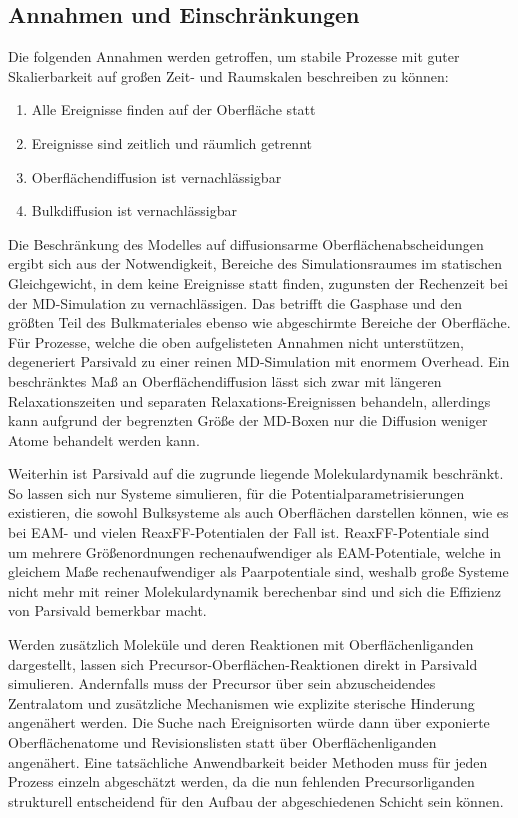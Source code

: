 \subsection{Annahmen und Einschränkungen}

Die folgenden Annahmen werden getroffen, um stabile Prozesse mit guter Skalierbarkeit auf großen Zeit- und Raumskalen beschreiben zu können:

\begin{enumerate}
\setlength\itemsep{0ex}
\item Alle Ereignisse finden auf der Oberfläche statt
\item Ereignisse sind zeitlich und räumlich getrennt
\item Oberflächendiffusion ist vernachlässigbar
\item Bulkdiffusion ist vernachlässigbar
\end{enumerate}

Die Beschränkung des Modelles auf diffusionsarme Oberflächenabscheidungen ergibt sich aus der Notwendigkeit, Bereiche des Simulationsraumes im statischen Gleichgewicht, in dem keine Ereignisse statt finden, zugunsten der Rechenzeit bei der MD-Simulation zu vernachlässigen.
Das betrifft die Gasphase und den größten Teil des Bulkmateriales ebenso wie abgeschirmte Bereiche der Oberfläche.
Für Prozesse, welche die oben aufgelisteten Annahmen nicht unterstützen, degeneriert Parsivald zu einer reinen MD-Simulation mit enormem Overhead.
Ein beschränktes Maß an Oberflächendiffusion lässt sich zwar mit längeren Relaxationszeiten und separaten Relaxations-Ereignissen behandeln, allerdings kann aufgrund der begrenzten Größe der MD-Boxen nur die Diffusion weniger Atome behandelt werden kann.

Weiterhin ist Parsivald auf die zugrunde liegende Molekulardynamik beschränkt.
So lassen sich nur Systeme simulieren, für die Potentialparametrisierungen existieren, die sowohl Bulksysteme als auch Oberflächen darstellen können, wie es bei EAM- und vielen ReaxFF-Potentialen der Fall ist.
ReaxFF-Potentiale sind um mehrere Größenordnungen rechenaufwendiger als EAM-Potentiale, welche in gleichem Maße rechenaufwendiger als Paarpotentiale sind, weshalb große Systeme nicht mehr mit reiner Molekulardynamik berechenbar sind und sich die Effizienz von Parsivald bemerkbar macht.

Werden zusätzlich Moleküle und deren Reaktionen mit Oberflächenliganden dargestellt, lassen sich Precursor-Oberflächen-Reaktionen direkt in Parsivald simulieren.
Andernfalls muss der Precursor über sein abzuscheidendes Zentralatom und zusätzliche Mechanismen wie explizite sterische Hinderung angenähert werden.
Die Suche nach Ereignisorten würde dann über exponierte Oberflächenatome und Revisionslisten statt über Oberflächenliganden angenähert.
Eine tatsächliche Anwendbarkeit beider Methoden muss für jeden Prozess einzeln abgeschätzt werden, da die nun fehlenden Precursorliganden strukturell entscheidend für den Aufbau der abgeschiedenen Schicht sein können.

